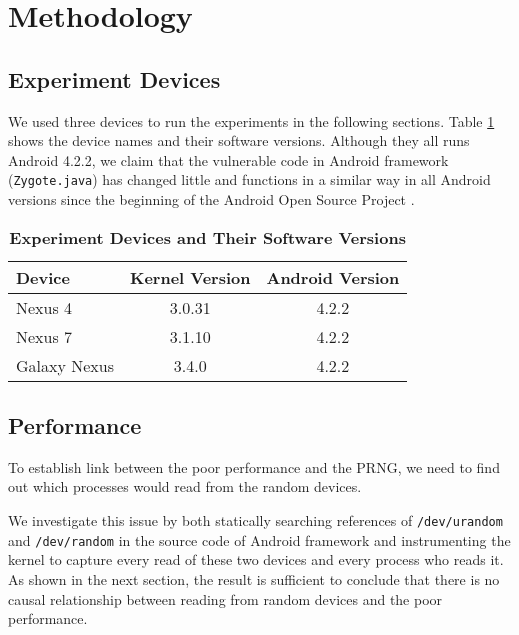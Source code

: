 \section{Methodology}

\subsection{Experiment Devices}

We used three devices to run the experiments in the following sections. Table \ref{tbldevice} shows the device names and their software versions. Although they all runs Android 4.2.2, we claim that the vulnerable code in Android framework (\verb|Zygote.java|) has changed little and functions in a similar way in all Android versions since the beginning of the Android Open Source Project \cite{zygotejava}. 

\begin{table}
\begin{center}
\begin{tabular}{|l|c|c|}
\hline
\bf Device & \bf Kernel Version & \bf Android Version \\
\hline
Nexus 4 & 3.0.31 & 4.2.2 \\
\hline
Nexus 7 & 3.1.10 & 4.2.2 \\
\hline
Galaxy Nexus & 3.4.0 & 4.2.2 \\
\hline

\end{tabular}
\end{center}
\caption{{\bf Experiment Devices and Their Software Versions} }
\label{tbldevice}
\end{table}


\subsection{Performance}

To establish link between the poor performance and the PRNG, we need to find out which processes would read from the random devices.

We investigate this issue by both statically searching references of \verb|/dev/urandom| and \verb|/dev/random| in the source code of Android framework and instrumenting the kernel to capture every read of these two devices and every process who reads it. As shown in the next section, the result is sufficient to conclude that there is no causal relationship between reading from random devices and the poor performance.

